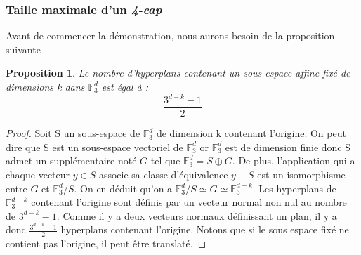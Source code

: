 \documentclass[a4paper,12pt,titlepage]{article}
\theoremstyle{plain}
\newtheorem{prop}{Proposition}
\newcommand{\Ftrois}[1]{\mathbb{F}^#1_3}
\theoremstyle{definition}
\begin{document}
\subsubsection{Taille maximale d'un \emph{4-cap}}
Avant de commencer la démonstration, nous aurons besoin de la proposition suivante
\begin{prop} \label{prop:nbhyp}
Le nombre d'hyperplans contenant un sous-espace affine fixé de dimensions k dans $\Ftrois{d}$ est égal à :
\[
\frac{3^{d-k}-1}{2}
\]
\end{prop}
\begin{proof}
Soit S un sous-espace de $\Ftrois{d}$ de dimension k contenant l'origine. On peut dire que S est un sous-espace vectoriel de $\Ftrois{d}$ or $\Ftrois{d}$ est de dimension finie donc S admet un supplémentaire noté $G$ tel que $\Ftrois{d} = S \oplus G$. De plus, l'application qui a chaque vecteur $y\in S$ associe sa classe d'équivalence $y + S$ est un isomorphisme entre $G$ et $\Ftrois{d}/S$. On en déduit qu'on a $\Ftrois{d}/S \simeq G \simeq \Ftrois{{d-k}}$.
Les hyperplans de $\Ftrois{{d-k}}$ contenant l'origine sont définis par un vecteur normal non nul au nombre de $3^{d-k}-1$. Comme il y a deux vecteurs normaux définissant un plan, il y a donc $\frac{3^{d-k}-1}{2}$ hyperplans contenant l'origine.
Notons que si le sous espace fixé ne contient pas l'origine, il peut être translaté.
\end{proof}
\end{document}
